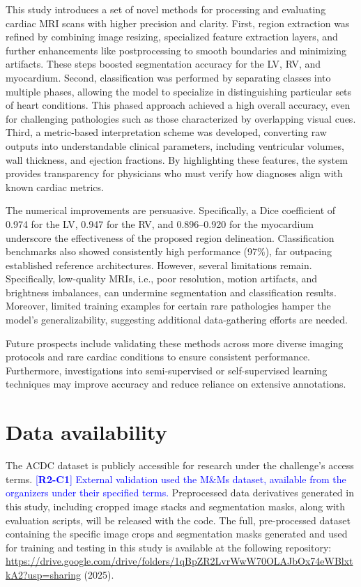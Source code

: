 \documentclass[fleqn,10pt]{wlscirep}
\newcommand{\revtag}[2]{[\textbf{R#1-C#2}]}
\newcommand{\Rtwo}[1]{\textcolor{blue}{#1}}
\begin{document}
This study introduces a set of novel methods for processing and evaluating cardiac MRI scans with higher precision and clarity. First, region extraction was refined by combining image resizing, specialized feature extraction layers, and further enhancements like postprocessing to smooth boundaries and minimizing artifacts. These steps boosted segmentation accuracy for the LV, RV, and myocardium. Second, classification was performed by separating classes into multiple phases, allowing the model to specialize in distinguishing particular sets of heart conditions. This phased approach achieved a high overall accuracy, even for challenging pathologies such as those characterized by overlapping visual cues. Third, a metric-based interpretation scheme was developed, converting raw outputs into understandable clinical parameters, including ventricular volumes, wall thickness, and ejection fractions. By highlighting these features, the system provides transparency for physicians who must verify how diagnoses align with known cardiac metrics.

The numerical improvements are persuasive. Specifically, a Dice coefficient of 0.974 for the LV, 0.947 for the RV, and 0.896--0.920 for the myocardium underscore the effectiveness of the proposed region delineation. Classification benchmarks also showed consistently high performance (97\%), far outpacing established reference architectures. However, several limitations remain. Specifically, low-quality MRIs, i.e., poor resolution, motion artifacts, and brightness imbalances, can undermine segmentation and classification results. Moreover, limited training examples for certain rare pathologies hamper the model's generalizability, suggesting additional data-gathering efforts are needed.

Future prospects include validating these methods across more diverse imaging protocols and rare cardiac conditions to ensure consistent performance. Furthermore, investigations into semi-supervised or self-supervised learning techniques may improve accuracy and reduce reliance on extensive annotations.

\section*{Data availability}
The ACDC dataset\cite{Bernard:2018} is publicly accessible for research under the challenge's access terms. \Rtwo{\revtag{2}{1} External validation used the M\&Ms dataset\cite{Campello:2021}, available from the organizers under their specified terms.} Preprocessed data derivatives generated in this study, including cropped image stacks and segmentation masks, along with evaluation scripts, will be released with the code. The full, pre-processed dataset containing the specific image crops and segmentation masks generated and used for training and testing in this study is available at the following repository: \url{https://drive.google.com/drive/folders/1qBpZR2LvrWwW70OLAJbOx74eWBlxtkA2?usp=sharing} (2025).
\end{document}
